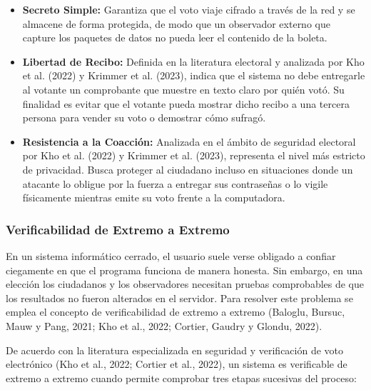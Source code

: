 \begin{itemize}
	\item \textbf{Secreto Simple:} Garantiza que el voto viaje cifrado a través de la red y se almacene de forma protegida, de modo que un observador externo que capture los paquetes de datos no pueda leer el contenido de la boleta.

	\item \textbf{Libertad de Recibo:} Definida en la literatura electoral y analizada por Kho et al. (2022) y Krimmer et al. (2023), indica que el sistema no debe entregarle al votante un comprobante que muestre en texto claro por quién votó. Su finalidad es evitar que el votante pueda mostrar dicho recibo a una tercera persona para vender su voto o demostrar cómo sufragó.

	\item \textbf{Resistencia a la Coacción:} Analizada en el ámbito de seguridad electoral por Kho et al. (2022) y Krimmer et al. (2023), representa el nivel más estricto de privacidad. Busca proteger al ciudadano incluso en situaciones donde un atacante lo obligue por la fuerza a entregar sus contraseñas o lo vigile físicamente mientras emite su voto frente a la computadora.
\end{itemize}

\subsubsection{Verificabilidad de Extremo a Extremo}

En un sistema informático cerrado, el usuario suele verse obligado a confiar ciegamente en que el programa funciona de manera honesta. Sin embargo, en una elección los ciudadanos y los observadores necesitan pruebas comprobables de que los resultados no fueron alterados en el servidor. Para resolver este problema se emplea el concepto de verificabilidad de extremo a extremo (Baloglu, Bursuc, Mauw y Pang, 2021; Kho et al., 2022; Cortier, Gaudry y Glondu, 2022).

De acuerdo con la literatura especializada en seguridad y verificación de voto electrónico (Kho et al., 2022; Cortier et al., 2022), un sistema es verificable de extremo a extremo cuando permite comprobar tres etapas sucesivas del proceso:

